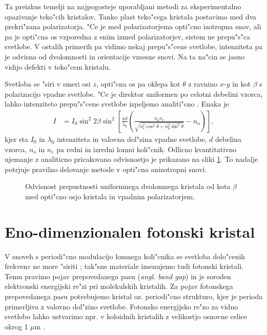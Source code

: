\documentclass[12pt,twoside,openright,final]{report}
\newcommand{\angl}[1]{(\textit{angl. #1})}
\begin{document}
Ta preizkus temelji na najpogosteje uporabljani metodi za eksperimentalno opazivanje teko"cih kristalov. 
Tanko plast teko"cega kristala postavimo med dva prekri"zana polarizatorja. 
"Ce je med polarizatorjema opti"cno izotropna snov, ali pa je opti"cna os vzporedna z enim izmed polarizatorjev, sistem ne prepu"s"ca svetlobe. 
V ostalih primerih pa vidimo nekaj prepu"s"cene svetlobe, intenziteta pa je odvisna od dvolomnosti in orientacije vmesne snovi. 
Na ta na"cin se jasno vidijo defekti v teko"cem kristalu. 

Svetloba se "siri v smeri osi $z$, opti"cna os pa oklepa kot $\theta$ z ravnino $x$-$y$ in kot $\beta$ s polarizacijo vpadne svetlobe. 
"Ce je direktor uniformen po celotni debelini vzorca, lahko intenziteto prepu"s"cene svetlobe izpeljemo analiti"cno \cite{kleman}. 
Enaka je
\begin{align}
 I &= I_0 \sin^2 2\beta \sin^2 \left[ \frac{\pi d}{\lambda_0} \left( \frac{n_o n_e}{\sqrt{n_e^2 \cos^2 \theta + n_0^2 \sin^2 \theta}} - n_o \right)\right],
\end{align}
kjer sta $I_0$ in $\lambda_0$ intenziteta in valovna dol"zina vpadne svetlobe, $d$ debelina vzorca, $n_o$ in $n_e$ pa redni in izredni lomni koli"cnik. 
Odlicno kvantitativno ujemanje z analiticno pricakovano odvisnostjo je prikazano na sliki \ref{fig:test-uniform}.
To nadalje potrjuje pravilno delovanje metode v opti"cno anizotropni snovi. 

\begin{figure}[h]
 
 \caption{Odvisnost prepustnosti uniformnega dvolomnega kristala od kota $\beta$ med opti"cno osjo kristala in vpadnim polarizatorjem. }
 \label{fig:test-uniform}
\end{figure}

\section{Eno-dimenzionalen fotonski kristal}
V snoveh s periodi"cno modulacijo lomnega koli"cnika se svetloba dolo"cenih frekvenc ne more "siriti \cite{hecht-nano,joannopoulos}; tak"sne materiale imenujemo tudi fotonski kristali. 
Temu pravimo pojav prepovedanega pasu \angl{band gap} in je soroden elektronski energijski re"zi pri molekulskih kristalih. 
Za pojav fotonskega prepovedanega pasu potrebujemo kristal oz. periodi"cno strukturo, kjer je perioda primerljiva z valovno dol"zino svetlobe. 
Fotonsko energijsko re"zo za vidno svetlobo lahko ustvarimo npr. v koloidnih kristalih z velikostjo osnovne celice okrog 1 $\mu$m \cite{colloidal-photonic-crystals}. 
\end{document}
